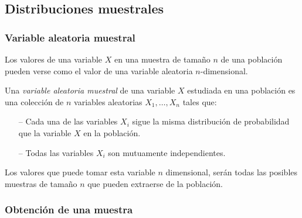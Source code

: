 \subsection{Distribuciones muestrales}
\begin{frame}
\frametitle{Variable aleatoria muestral}
Los valores de una variable $X$ en una muestra de tamaño $n$ de una población pueden verse como el valor de una variable aleatoria $n$-dimensional.

\begin{definicion}
Una \emph{variable aleatoria muestral} de una variable $X$ estudiada en una población es una colección de $n$ variables aleatorias $X_1,\ldots,X_n$ tales que:
\begin{itemize}
\item[--] Cada una de las variables $X_i$ sigue la misma distribución de probabilidad que la variable $X$ en la población.
\item[--] Todas las variables $X_i$ son mutuamente independientes. 
\end{itemize}
\end{definicion}

Los valores que puede tomar esta variable $n$ dimensional, serán todas las posibles muestras de tamaño $n$ que pueden extraerse de la población.
\end{frame}


\begin{frame}
\frametitle{Obtención de una muestra}
\begin{center}

\end{center}
\end{frame}


